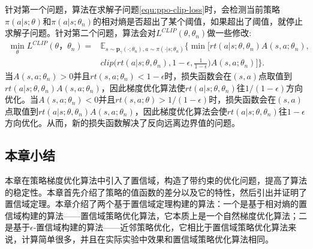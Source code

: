 针对第一个问题，算法在求解子问题\eqref{equ:ppo-clip-loss}时，会检测当前策略$\pi(a \vert s; \theta)$和$\pi(a \vert s; \theta_n)$的相对熵是否超出了某个阈值，如果超出了阈值，就停止求解子问题。针对第二个问题，算法会对$L^{CLIP}(\theta, \theta_n)$做一些修改:
\begin{equation}
    \begin{aligned}
    \min_{\theta} L^{CLIP}(\theta，\theta_n) =& 
    \mathbb{E}_{s \sim \mathbf{p}_{\gamma}(\cdot; \theta_n), a \sim \pi(\cdot \vert s; \theta_n)}\bigg\{
    \min
    \bigg[
        rt(a \vert s; \theta, \theta_n) A(s, a; \theta_n), \\
        & clip\bigg(rt(a \vert s; \theta, \theta_n), 1 - \epsilon, \frac{1}{1 - \epsilon}
        \bigg) A(s, a; \theta_n)
    \bigg]
    \bigg\}.
    \end{aligned}
\end{equation}
当$A(s, a; \theta_n) > 0$并且$rt(s, a; \theta_n) < 1 - \epsilon$时，损失函数会在$(s, a)$点取值到$rt(a \vert s; \theta, \theta_n)A(s, a; \theta_n)$，因此梯度优化算法使$rt(a \vert s; \theta, \theta_n)$往$1/(1 - \epsilon)$方向优化。当$A(s, a; \theta_n) < 0$并且$rt(s, a; \theta) > 1 / (1 - \epsilon)$时，损失函数会在$(s, a)$点取值到$rt(a \vert s; \theta, \theta_n)A(s, a; \theta_n)$，因此梯度优化算法会使$rt(a \vert s; \theta, \theta_n)$往$1 - \epsilon$方向优化。从而，新的损失函数解决了反向远离边界值的问题。
\subsection{本章小结}
本章在策略梯度优化算法中引入了置信域，构造了带约束的优化问题，提高了算法的稳定性。本章首先介绍了策略的值函数的差分以及它的特性，然后引出并证明了置信域定理。本章介绍了两个基于置信域定理构建的算法：一个是基于相对熵的置信域构建的算法——置信域策略优化算法，它本质上是一个自然梯度优化算法；二是基于$\epsilon$-置信域构建的算法——近邻策略优化，它相比于置信域策略优化算法来说，计算简单很多，并且在实际实验中效果和置信域策略优化算法相同。
